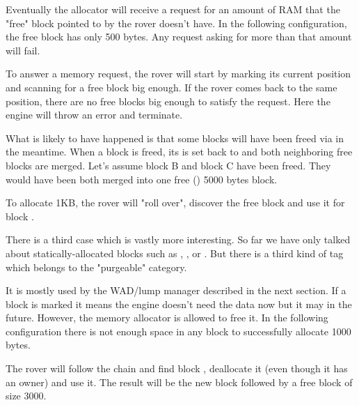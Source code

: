 Eventually the allocator will receive a request for an amount of RAM that the "free" block pointed to by the rover doesn't have. In the following configuration, the free block has only 500 bytes. Any request asking for more than that amount will fail.\\
\par
{}
\par
To answer a memory request, the rover will start by marking its current position and scanning for a free block big enough. If the rover comes back to the same position, there are no free blocks big enough to satisfy the request. Here the engine will throw an error and terminate.\\
\par
What is likely to have happened is that some blocks will have been freed via  in the meantime. When a block is freed, its  is set back to  and both neighboring free blocks are merged. Let's assume block B and block C have been freed. They would have been both merged into one free () 5000 bytes block.\\
\par
{}
\par
To allocate 1KB, the rover will "roll over", discover the free block and use it for block .\\
\par
{}
\par
There is a third case which is vastly more interesting. So far we have only talked about statically-allocated blocks such as , , or . But there is a third kind of tag which belongs to the "purgeable" category.\\
\par
 It is mostly used by the WAD/lump manager described in the next section. If a block is marked  it means the engine doesn't need the data now but it may in the future. However, the memory allocator is allowed to free it. In the following configuration there is not enough space in any block to successfully allocate 1000 bytes.\\
\par
{}
\par
The rover will follow the chain and find block , deallocate it (even though it has an owner) and use it. The result will be the new block  followed by a free block of size 3000.\\
